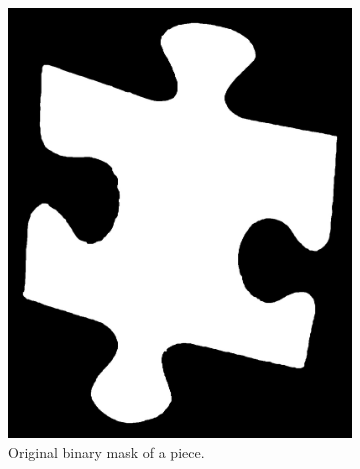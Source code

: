 \documentclass{article}
\begin{document}
\begin{figure}
  \begin{subfigure}{0.3\textwidth}
    \centering
    \includegraphics[width=\linewidth]{pictures/original_piece.jpeg}
    \caption{Original binary mask of a piece.}
    \label{fig:s_s_og}
  \end{subfigure}
  \hfill
  \begin{subfigure}{0.3\textwidth}
    \centering

\end{subfigure}
\end{figure}
\end{document}

